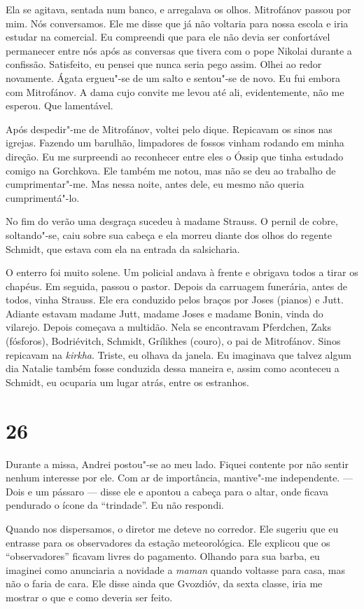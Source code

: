 Ela se agitava, sentada num banco, e arregalava os olhos. Mitrofánov
passou por mim. Nós conversamos. Ele me disse que já não voltaria para
nossa escola e iria estudar na comercial. Eu compreendi que para ele não
devia ser confortável permanecer entre nós após as conversas que tivera
com o pope Nikolai durante a confissão. Satisfeito, eu pensei que nunca
seria pego assim. Olhei ao redor novamente. Ágata ergueu"-se de um salto
e sentou"-se de novo. Eu fui embora com Mitrofánov. A dama cujo convite
me levou até ali, evidentemente, não me esperou. Que lamentável.

Após despedir"-me de Mitrofánov, voltei pelo dique. Repicavam os sinos
nas igrejas. Fazendo um barulhão, limpadores de fossos vinham rodando em
minha direção. Eu me surpreendi ao reconhecer entre eles o Óssip que
tinha estudado comigo na Gorchkova. Ele também me notou, mas não se deu
ao trabalho de cumprimentar"-me. Mas nessa noite, antes dele, eu mesmo
não queria cumprimentá"-lo.

No fim do verão uma desgraça sucedeu à madame Strauss. O pernil de
cobre, soltando"-se, caiu sobre sua cabeça e ela morreu diante dos olhos
do regente Schmidt, que estava com ela na entrada da salsicharia.

O enterro foi muito solene. Um policial andava à frente e obrigava todos
a tirar os chapéus. Em seguida, passou o pastor. Depois da carruagem
funerária, antes de todos, vinha Strauss. Ele era conduzido pelos braços
por Joses (pianos) e Jutt. Adiante estavam madame Jutt, madame Joses e
madame Bonin, vinda do vilarejo. Depois começava a multidão. Nela se
encontravam Pferdchen, Zaks (fósforos), Bodriévitch, Schmidt, Grílikhes
(couro), o pai de Mitrofánov. Sinos repicavam na \emph{kirkha}. Triste,
eu olhava da janela. Eu imaginava que talvez algum dia Natalie também
fosse conduzida dessa maneira e, assim como aconteceu a Schmidt, eu
ocuparia um lugar atrás, entre os estranhos.

\section{26}

Durante a missa, Andrei postou"-se ao meu lado. Fiquei contente por não
sentir nenhum interesse por ele. Com ar de importância, mantive"-me
independente. --- Dois e um pássaro --- disse ele e apontou a cabeça
para o altar, onde ficava pendurado o ícone da ``trindade''. Eu não
respondi.

Quando nos dispersamos, o diretor me deteve no corredor. Ele sugeriu que
eu entrasse para os observadores da estação meteorológica. Ele explicou
que os ``observadores'' ficavam livres do pagamento. Olhando para sua
barba, eu imaginei como anunciaria a novidade a \emph{maman} quando
voltasse para casa, mas não o faria de cara. Ele disse ainda que
Gvozdióv, da sexta classe, iria me mostrar o que e como deveria ser
feito.

